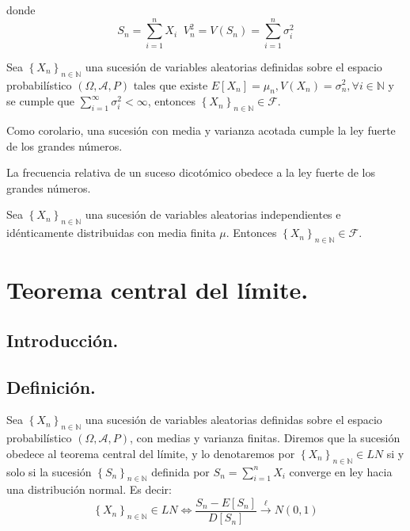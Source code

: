 donde
\begin{equation*}
S_n=\sum_{i=1}^nX_i\;\;V_n^2=V(S_n)=\sum_{i=1}^n\sigma_i^2
\end{equation*}

\begin{teorema}[Kolmogorov]
Sea $ \left\{X_n\right\}_{n\in\mathbb{N}}$ una sucesi\'on de variables aleatorias definidas sobre el espacio probabil\'istico $\left(\Omega,\mathcal{A}, P\right) $ tales que existe $E[X_n]=\mu_n, V(X_n)=\sigma_n^2,\forall i \in\mathbb{N}$ y se cumple que $\sum_{i=1}^{\infty}\sigma^2_i<\infty$, entonces $ \left\{X_n\right\}_{n\in\mathbb{N}}\in\mathscr{F}$.
\end{teorema}

Como corolario, una sucesi\'on con media y varianza acotada cumple la ley fuerte de los grandes n\'umeros.
\begin{teorema}
La frecuencia relativa de un suceso dicot\'omico obedece a la ley fuerte de los grandes n\'umeros.
\end{teorema}

\begin{teorema}[Khintchine]
Sea $ \left\{X_n\right\}_{n\in\mathbb{N}}$ una sucesi\'on de variables aleatorias independientes e id\'enticamente distribuidas con media finita $\mu$. Entonces $\left\{X_n\right\}_{n\in\mathbb{N}}\in\mathscr{F}$.
\end{teorema}

\section{Teorema central del l\'imite.}

\subsection{Introducci\'on.}


\subsection{Definici\'on.}
\begin{definicion}
Sea $ \left\{X_n\right\}_{n\in\mathbb{N}}$ una sucesi\'on de variables aleatorias definidas sobre el espacio probabil\'istico $\left(\Omega,\mathcal{A}, P\right) $, con medias y varianza finitas. Diremos que la sucesi\'on obedece al teorema central del l\'imite, y lo denotaremos por $\left\{X_n\right\}_{n\in\mathbb{N}}\in LN$ si y solo si la sucesi\'on $\left\{S_n\right\}_{n\in\mathbb{N}}$ definida por $S_n=\sum_{i=1}^nX_i$ converge en ley hacia una distribuci\'on normal. Es decir:
\begin{equation*}
\left\{X_n\right\}_{n\in\mathbb{N}}\in LN\Leftrightarrow \dfrac{S_n-E[S_n]}{D[S_n]}\overset{\ell}{\to}N(0,1)
\end{equation*}
\end{definicion}

